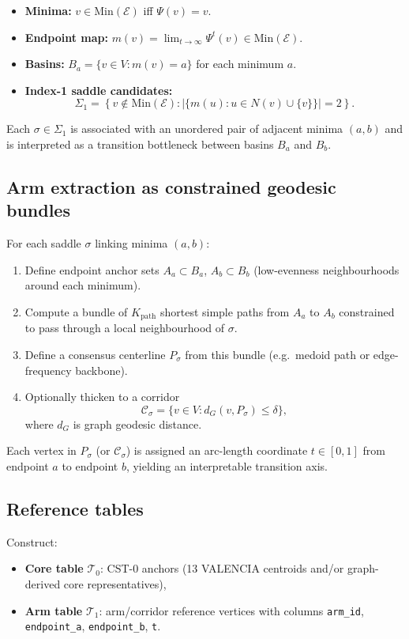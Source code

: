 \documentclass[11pt]{article}
\theoremstyle{plain}
\newcommand{\E}{\mathcal{E}}
\newcommand{\Min}{\mathrm{Min}}
\begin{document}
\begin{itemize}[noitemsep]
  \item \textbf{Minima:} $v\in\Min(\E)$ iff $\Psi(v)=v$.
  \item \textbf{Endpoint map:} $m(v)=\lim_{t\to\infty}\Psi^{t}(v)\in\Min(\E)$.
  \item \textbf{Basins:} $B_a=\{v\in V:m(v)=a\}$ for each minimum $a$.
  \item \textbf{Index-1 saddle candidates:}
        \[
          \Sigma_1=\left\{v\notin\Min(\E):
          \left|\{m(u):u\in N(v)\cup\{v\}\}\right|=2\right\}.
        \]
\end{itemize}

Each $\sigma\in\Sigma_1$ is associated with an unordered pair of adjacent
minima $(a,b)$ and is interpreted as a transition bottleneck between basins
$B_a$ and $B_b$.

\subsection{Arm extraction as constrained geodesic bundles}

For each saddle $\sigma$ linking minima $(a,b)$:
\begin{enumerate}[noitemsep]
  \item Define endpoint anchor sets $A_a\subset B_a$, $A_b\subset B_b$
        (low-evenness neighbourhoods around each minimum).
  \item Compute a bundle of $K_{\mathrm{path}}$ shortest simple paths from
        $A_a$ to $A_b$ constrained to pass through a local neighbourhood of
        $\sigma$.
  \item Define a consensus centerline $P_\sigma$ from this bundle
        (e.g.\ medoid path or edge-frequency backbone).
  \item Optionally thicken to a corridor
        \[
          \mathcal{C}_\sigma=\{v\in V:d_G(v,P_\sigma)\le \delta\},
        \]
        where $d_G$ is graph geodesic distance.
\end{enumerate}

Each vertex in $P_\sigma$ (or $\mathcal{C}_\sigma$) is assigned an arc-length
coordinate $t\in[0,1]$ from endpoint $a$ to endpoint $b$, yielding an
interpretable transition axis.

\subsection{Reference tables}

Construct:
\begin{itemize}[noitemsep]
  \item \textbf{Core table} $\mathcal{T}_0$: CST-0 anchors (13 VALENCIA
        centroids and/or graph-derived core representatives),
  \item \textbf{Arm table} $\mathcal{T}_1$: arm/corridor reference vertices
        with columns \texttt{arm\_id}, \texttt{endpoint\_a},
        \texttt{endpoint\_b}, \texttt{t}.
\end{itemize}
\end{document}
